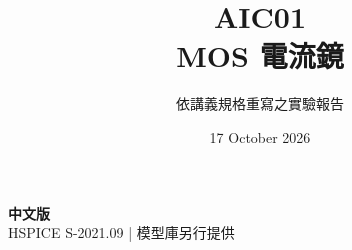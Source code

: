 \documentclass[11pt,a4paper]{article}
\title{\color{accent}AIC01\\[4pt]MOS 電流鏡}
\author{依講義規格重寫之實驗報告}
\date{17 October 2026}
\begin{document}
\maketitle
\begin{center}\small\textbf{中文版}\\
HSPICE S-2021.09 \quad | \quad 模型庫另行提供
\end{center}


\end{document}
